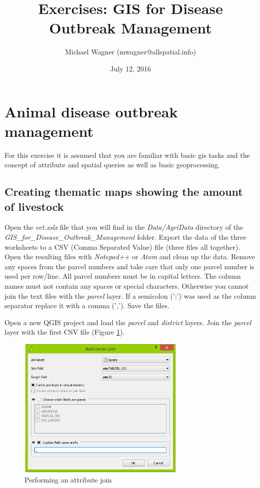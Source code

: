 \documentclass[a4paper,12pt,titlepage]{article}
\title{Exercises: GIS for Disease Outbreak Management}
\author{Michael Wagner (mwagner@allspatial.info)}
\date{July 12, 2016}
\begin{document}
             											
\maketitle                   										

\tableofcontents
\listoffigures
\newpage
\printglossary[type=\acronymtype,title={List of Abbreviations}]
\newpage

\section{Animal disease outbreak management}

For this exercise it is assumed that you are familiar with basic \gls{gis} tasks and the concept of attribute and spatial queries as well as basic geoprocessing.

\subsection{Creating thematic maps showing the amount of livestock}

Open the \textit{vet.xslx} file that you will find in the \textit{Data/AgriData} directory of the \textit{GIS\_for\_Disease\_Outbreak\_Management} folder. Export the data of the three worksheets to a CSV (Comma Separated Value) file (three files all together). Open the resulting files with \textit{Notepad++} or \textit{Atom} and clean up the data. Remove any spaces from the parcel numbers and take care that only one parcel number is used per row/line. All parcel numbers must be in capital letters. The column names must not contain any spaces or special characters. Otherwise you cannot join the text files with the \textit{parcel} layer. If a semicolon (';') was used as the column separator replace it with a comma (','). Save the files.

Open a new QGIS project and load the \textit{parcel} and \textit{district} layers. Join the \textit{parcel} layer with the first CSV file (Figure \ref{fig:join2}).

\begin{figure}[htb]
	\centering
	\includegraphics[width=8cm]{Images/join2.png}
	\caption{Performing an attribute join}\label{fig:join2}
\end{figure}
\end{document}

